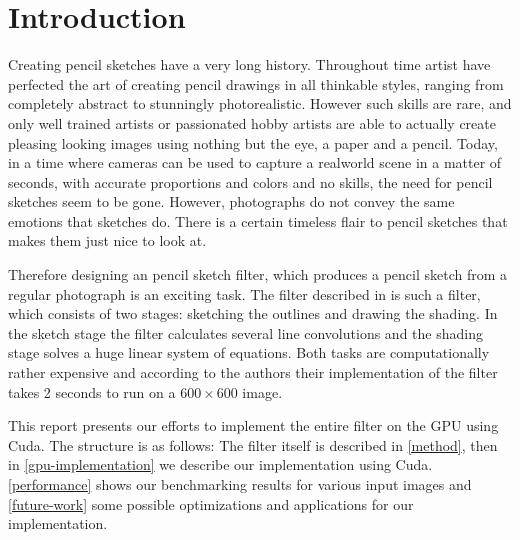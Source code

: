 \section{Introduction}
Creating pencil sketches have a very long history. Throughout time artist have
perfected the art of creating pencil drawings in all thinkable styles, ranging
from completely abstract to stunningly photorealistic. However such skills are
rare, and only well trained artists or passionated hobby artists are able to
actually create pleasing looking images using nothing but the eye, a paper and a
pencil. Today, in a time where cameras can be used to capture a realworld scene
in a matter of seconds, with accurate proportions and colors and no skills, the
need for pencil sketches seem to be gone.  However, photographs do not convey
the same emotions that sketches do. There is a certain timeless flair to pencil
sketches that makes them just nice to look at.

Therefore designing an pencil sketch filter, which produces a pencil sketch from
a regular photograph is an exciting task. The filter described in
\cite{mainPaper} is such a filter, which consists of two stages: sketching the
outlines and drawing the shading. In the sketch stage the filter calculates several
line convolutions and the shading stage solves a huge linear system of
equations. Both tasks are computationally rather expensive and according to the
authors their implementation of the filter takes 2 seconds to run on a
$600\times 600$ image.



This report presents our efforts to implement the entire filter on the GPU using
Cuda. The structure is as follows: The filter itself is described in
\autoref{method}, then in \autoref{gpu-implementation} we describe our
implementation using Cuda. \autoref{performance} shows our benchmarking results
for various input images and \autoref{future-work} some possible optimizations
and applications for our implementation.
